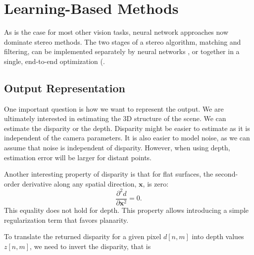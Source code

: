 





\section{Learning-Based Methods}

As is the case for most other vision tasks, neural network approaches now dominate stereo methods.  The two stages of a stereo algorithm, matching and filtering, can be implemented separately by neural networks \cite{Zbontar2015}, or together in a single, end-to-end optimization (\cite{Zhang2019GANet,Chang2018,Mayer2016,Kendall2017}.

\subsection{Output Representation}

One important question is how  we want to represent the output. We are ultimately interested in estimating the 3D structure of the scene. We can estimate the disparity or the depth. Disparity might be easier to estimate as it is independent of the camera parameters. It is also easier to model noise, as we can assume that noise is independent of disparity. However, when using depth, estimation error will be larger for distant points.

Another interesting property of disparity is that for flat surfaces, the second-order derivative along any spatial direction, $\mathbf{x}$, is zero:
\begin{equation}
    \frac{\partial^2 d}{\partial \mathbf{x}^2}  = 0.
\end{equation}
This equality does not hold for depth. This property allows introducing a simple regularization term that favors planarity.

To translate the returned disparity for a given pixel $d\left[n,m \right]$ into depth values $z\left[n,m \right]$, we need to invert the disparity, that is

